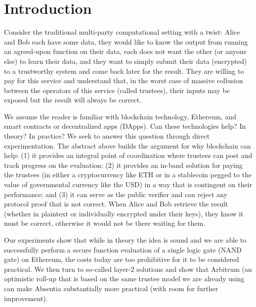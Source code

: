 


\section{Introduction}

Consider the traditional multi-party computational setting with a twist: Alice and Bob each have some data, they would like to know the output from running an agreed-upon function on their data, each does not want the other (or anyone else) to learn their data, and they want to simply submit their data (\eg encrypted) to a trustworthy system and come back later for the result. They are willing to pay for this service and understand that, in the worst case of massive collusion between the operators of this service (called trustees), their inputs may be exposed but the result will always be correct.

We assume the reader is familiar with blockchain technology, Ethereum, and smart contracts or decentralized apps (DApps). Can these technologies help? In theory? In practice? We seek to answer this question through direct experimentation. The abstract above builds the argument for why blockchain can help: (1) it provides an integral point of coordination where trustees can post and track progress on the evaluation; (2) it provides an in-band solution for paying the trustees (in either a cryptocurrency like ETH or in a stablecoin pegged to the value of governmental currency like the USD) in a way that is contingent on their performance; and (3) it can serve as the public verifier and can reject any protocol proof that is not correct. When Alice and Bob retrieve the result (whether in plaintext or individually encrypted under their keys), they know it must be correct, otherwise it would not be there waiting for them.

Our experiments show that while in theory the idea is sound and we are able to successfully perform a secure function evaluation of a single logic gate (NAND gate) on Ethereum, the costs today are too prohibitive for it to be considered practical. We then turn to so-called layer-2 solutions and show that Arbitrum (an optimistic roll-up that is based on the same trustee model we are already using~\cite{KGCWF18} can make Absentia substantially more practical (with room for further improvement).
 
